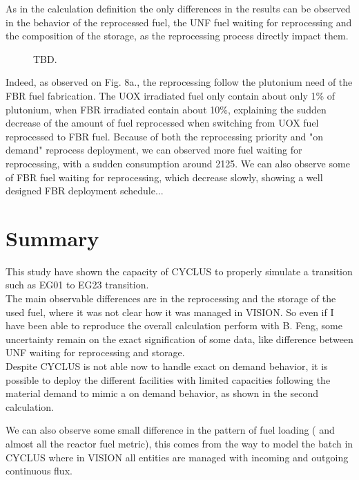 \documentclass[12pt]{article}
\begin{document}
As in the calculation definition the only
differences in the results can be observed in the
behavior of the reprocessed fuel, the UNF fuel
waiting for reprocessing and the composition of
the storage, as the reprocessing process directly
impact them.

\begin{figure}[h!]
\centering
{}
\caption{TBD.\label{fig:ARR_FWR_SFC_2} }
\end{figure}

Indeed, as observed on Fig. 8a., the reprocessing
follow the plutonium need of the FBR fuel
fabrication. The UOX irradiated fuel only contain
about only 1\% of plutonium, when FBR irradiated
contain about 10\%, explaining the sudden decrease
of the  amount of fuel reprocessed when switching
from UOX fuel reprocessed to FBR fuel.
Because of both the reprocessing priority and "on
demand" reprocess deployment, we can observed more
fuel waiting for reprocessing, with a sudden
consumption around 2125. We can also observe some
of FBR fuel waiting for reprocessing, which
decrease slowly, showing a well designed FBR
deployment schedule...

\section{Summary}
This study have shown the capacity of CYCLUS to
properly simulate a transition such as EG01 to
EG23 transition.\\
The main observable differences are in the
reprocessing and the storage of the used fuel,
where it was not clear how it was managed in
VISION. So even if I have been able to reproduce
the overall calculation perform with B. Feng, some
uncertainty remain on the exact signification of
some data, like difference between UNF waiting for
reprocessing and storage.\\
Despite CYCLUS is not able now to handle exact on
demand behavior, it is possible to deploy the
different facilities with limited capacities
following the material demand to mimic a on demand
behavior, as shown in the second calculation.

We can also observe some small difference in the
pattern of fuel loading ( and almost all the
reactor fuel metric), this comes from the way to
model the batch in CYCLUS where in VISION all
entities are managed with incoming and outgoing
continuous flux.







\end{document}
